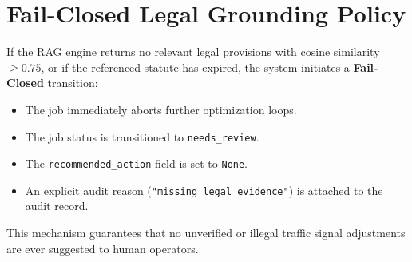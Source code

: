 \section{Fail-Closed Legal Grounding Policy}
If the RAG engine returns no relevant legal provisions with cosine similarity $\ge 0.75$, or if the referenced statute has expired, the system initiates a \textbf{Fail-Closed} transition:
\begin{itemize}[leftmargin=1.5cm, label=--]
  \item The job immediately aborts further optimization loops.
  \item The job status is transitioned to \texttt{needs\_review}.
  \item The \texttt{recommended\_action} field is set to \texttt{None}.
  \item An explicit audit reason (\texttt{"missing\_legal\_evidence"}) is attached to the audit record.
\end{itemize}
This mechanism guarantees that no unverified or illegal traffic signal adjustments are ever suggested to human operators.

